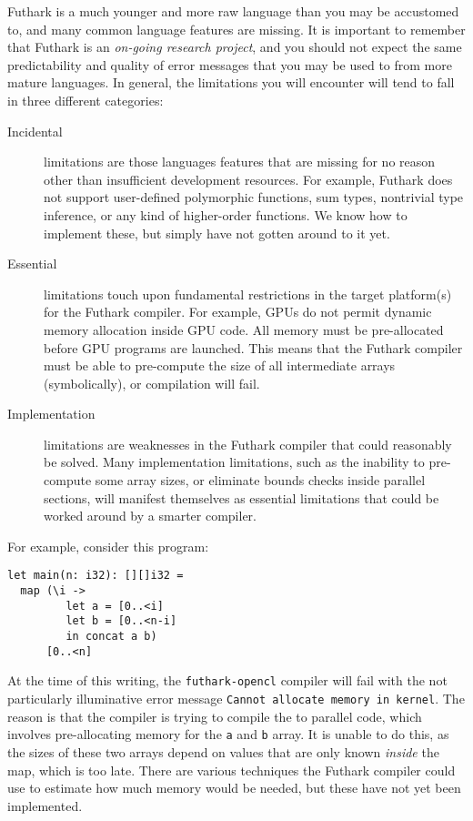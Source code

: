 \documentclass[oneside,11pt]{book}
\begin{document}
Futhark is a much younger and more raw language than you may be
accustomed to, and many common language features are missing.  It is
important to remember that Futhark is an \textit{on-going research
  project}, and you should not expect the same predictability and
quality of error messages that you may be used to from more mature
languages.  In general, the limitations you will encounter will tend
to fall in three different categories:

\begin{description}
\item[Incidental] limitations are those languages features that are
  missing for no reason other than insufficient development resources.
  For example, Futhark does not support user-defined polymorphic
  functions, sum types, nontrivial type inference, or any kind of
  higher-order functions.  We know how to implement these, but simply
  have not gotten around to it yet.

\item[Essential] limitations touch upon fundamental restrictions in
  the target platform(s) for the Futhark compiler.  For example, GPUs
  do not permit dynamic memory allocation inside GPU code.  All memory
  must be pre-allocated before GPU programs are launched.  This means
  that the Futhark compiler must be able to pre-compute the size of
  all intermediate arrays (symbolically), or compilation will fail.

\item[Implementation] limitations are weaknesses in the Futhark
  compiler that could reasonably be solved.  Many implementation
  limitations, such as the inability to pre-compute some array sizes,
  or eliminate bounds checks inside parallel sections, will manifest
  themselves as essential limitations that could be worked around by a
  smarter compiler.
\end{description}

For example, consider this program:

\begin{lstlisting}
let main(n: i32): [][]i32 =
  map (\i ->
         let a = [0..<i]
         let b = [0..<n-i]
         in concat a b)
      [0..<n]
\end{lstlisting}

At the time of this writing, the \texttt{futhark-opencl} compiler will
fail with the not particularly illuminative error message
\texttt{Cannot allocate memory in kernel}.  The reason is that the
compiler is trying to compile the  to parallel code, which
involves pre-allocating memory for the \texttt{a} and \texttt{b}
array.  It is unable to do this, as the sizes of these two arrays
depend on values that are only known \textit{inside} the map, which is
too late.  There are various techniques the Futhark compiler could use
to estimate how much memory would be needed, but these have not yet
been implemented.
\end{document}
